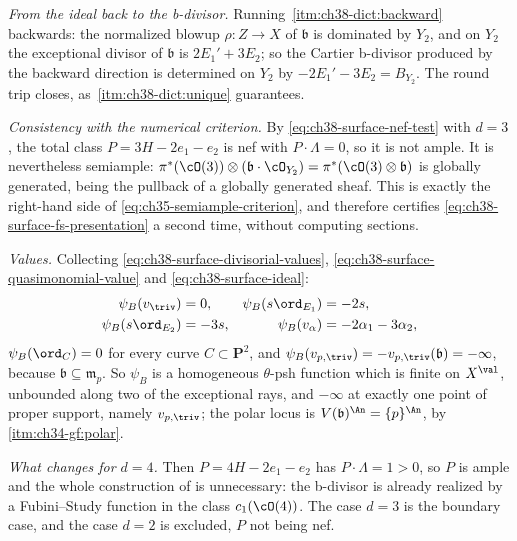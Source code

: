\begin{example}
\emph{From the ideal back to the b-divisor.}  Running
\,\cref{itm:ch38-dict:backward}
backwards: the normalized blowup $\rho:Z\to X$ of $\mathfrak b$ is
dominated by $Y_2$, and on $Y_2$ the exceptional divisor of
$\mathfrak b$ is $2E_1'+3E_2$; so the Cartier b-divisor produced by
the backward direction is determined on $Y_2$ by
$-2E_1'-3E_2=B_{Y_2}$.  The round trip closes, as
\,\cref{itm:ch38-dict:unique}
guarantees.

\emph{Consistency with the numerical criterion.}  By
\eqref{eq:ch38-surface-nef-test} with $d=3$, the total class
$P=3H-2e_1-e_2$ is nef with $P\cdot\Lambda=0$, so it is not ample.  It
is nevertheless semiample: $\pi^*(\cO(3))\otimes(\mathfrak b\cdot\cO_{Y_2})
=\pi^*(\cO(3)\otimes\mathfrak b)$ is globally generated, being the
pullback of a globally generated sheaf.  This is exactly the right-hand
side of \eqref{eq:ch35-semiample-criterion}, and
 therefore certifies
\eqref{eq:ch38-surface-fs-presentation} a second time, without computing
sections.

\emph{Values.}  Collecting
\eqref{eq:ch38-surface-divisorial-values},
\eqref{eq:ch38-surface-quasimonomial-value} and
\eqref{eq:ch38-surface-ideal}:
\[
 \begin{aligned}
 \psi_B(v_{\triv})&=0,
 &\psi_B(s\ord_{E_1})&=-2s,\\
 \psi_B(s\ord_{E_2})&=-3s,
 &\psi_B(v_\alpha)&=-2\alpha_1-3\alpha_2,
 \end{aligned}
\]
$\psi_B(\ord_C)=0$ for every curve $C\subset\mathbf P^2$, and
$\psi_B(v_{p,\triv})=-v_{p,\triv}(\mathfrak b)=-\infty$, because
$\mathfrak b\subseteq\mathfrak m_p$.  So $\psi_B$ is a homogeneous
$\theta$-psh function which is finite on $X^{\val}$, unbounded along
two of the exceptional rays, and $-\infty$ at exactly one point of
proper support, namely $v_{p,\triv}$; the polar locus is
$V(\mathfrak b)^{\An}=\{p\}^{\An}$, by
\,\cref{itm:ch34-gf:polar}.

\emph{What changes for $d=4$.}  Then $P=4H-2e_1-e_2$ has
$P\cdot\Lambda=1>0$, so $P$ is ample and the whole construction of
 is unnecessary: the b-divisor is already realized by
a Fubini--Study function in the class $c_1(\cO(4))$.  The case $d=3$ is
the boundary case, and the case $d=2$ is excluded, $P$ not being nef.
\end{example}

